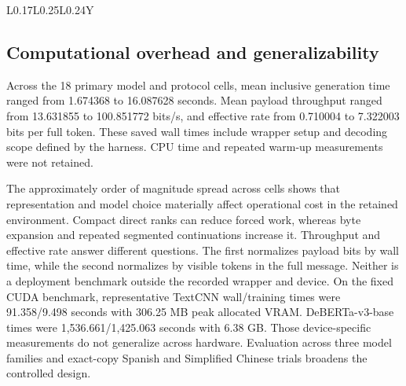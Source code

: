 \documentclass[fleqn,10pt]{wlscirep}
\begin{document}
\begin{table}[H]
\begin{tabularx}{\textwidth}{L{0.17\textwidth}L{0.25\textwidth}L{0.24\textwidth}Y}
\bottomrule
\end{tabularx}
\caption{\label{tab:v3-summary}\textbf{Summary of detector, entropy and quantization analyses.} The entropy rate counts eight bits per serialized payload byte per generated token and is conditional on completion. It is not a Shannon channel capacity. Entropy recovery proportions use all 120 attempts. Detector triples are TextCNN, DeBERTa-v3-base, and exact model aware surprisal. Empirical 0.1\% operating points are unavailable for the 250-negative human comparison and every entropy and quantization subgroup because each has fewer than 1,000 negatives. Detailed denominators, intervals, thresholds, and condition-level results appear in Supplementary Notes S11-S15.}
\end{table}






\subsection*{Computational overhead and generalizability}\label{sec:results-overhead}

Across the 18 primary model and protocol cells, mean inclusive generation time ranged from 1.674368 to 16.087628 seconds. Mean payload throughput ranged from 13.631855 to 100.851772 bits/s, and effective rate from 0.710004 to 7.322003 bits per full token. These saved wall times include wrapper setup and decoding scope defined by the harness. CPU time and repeated warm-up measurements were not retained.

The approximately order of magnitude spread across cells shows that representation and model choice materially affect operational cost in the retained environment. Compact direct ranks can reduce forced work, whereas byte expansion and repeated segmented continuations increase it. Throughput and effective rate answer different questions. The first normalizes payload bits by wall time, while the second normalizes by visible tokens in the full message. Neither is a deployment benchmark outside the recorded wrapper and device.
On the fixed CUDA benchmark, representative TextCNN wall/training times were 91.358/9.498 seconds with 306.25 MB peak allocated VRAM. DeBERTa-v3-base times were 1,536.661/1,425.063 seconds with 6.38 GB. Those device-specific measurements do not generalize across hardware. Evaluation across three model families and exact-copy Spanish and Simplified Chinese trials broadens the controlled design.%
\end{document}
